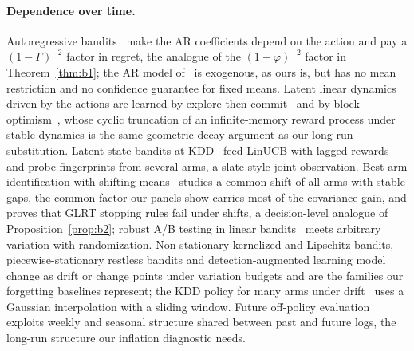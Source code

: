 \documentclass[sigconf,review,anonymous]{acmart}
\begin{document}
\paragraph{Dependence over time.} Autoregressive bandits~\cite{bacchiocchi2024arb} make the AR coefficients depend on the action and pay a $(1-\Gamma)^{-2}$ factor in regret, the analogue of the $(1-\varphi)^{-2}$ factor in Theorem~\ref{thm:b1}; the AR model of~\cite{chen2023autoregressive} is exogenous, as ours is, but has no mean restriction and no confidence guarantee for fixed means. Latent linear dynamics driven by the actions are learned by explore-then-commit~\cite{choi2026etc} and by block optimism~\cite{hwang2026block}, whose cyclic truncation of an infinite-memory reward process under stable dynamics is the same geometric-decay argument as our long-run substitution. Latent-state bandits at KDD~\cite{jin2026latent} feed LinUCB with lagged rewards and probe fingerprints from several arms, a slate-style joint observation. Best-arm identification with shifting means~\cite{zierahn2026shifting} studies a common shift of all arms with stable gaps, the common factor our panels show carries most of the covariance gain, and proves that GLRT stopping rules fail under shifts, a decision-level analogue of Proposition~\ref{prop:b2}; robust A/B testing in linear bandits~\cite{xiong2024abtesting} meets arbitrary variation with randomization. Non-stationary kernelized and Lipschitz bandits, piecewise-stationary restless bandits and detection-augmented learning model change as drift or change points under variation budgets and are the families our forgetting baselines represent; the KDD policy for many arms under drift~\cite{everett2025quickdraw} uses a Gaussian interpolation with a sliding window. Future off-policy evaluation~\cite{shimizu2025opfv} exploits weekly and seasonal structure shared between past and future logs, the long-run structure our inflation diagnostic needs.
\end{document}
